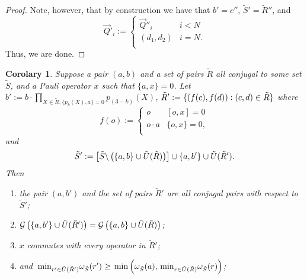\documentclass[twocolumn,showpacs,preprintnumbers,amsmath,amssymb,nofootinbib,pra,floatfix]{revtex4-1}
\newtheorem{corolary}{Corolary}
\newcommand{\lst}{\vec}
\newcommand{\set}{\tilde}
\newcommand{\genfun}{\mathcal{G}}
\begin{document}
\begin{proof}
Note, however, that by construction we have that $b'=c''$, $\set S'=\set R''$, and
$$\lst Q'_i :=
\begin{cases}
\lst Q''_i & i < N \\
(d_1,d_2) & i = N.\\
\end{cases}
$$
Thus, we are done.
\end{proof}
\begin{corolary}
\label{recombination-to-make-commute}
Suppose a pair $(a,b)$ and a set of pairs $\set R$ all conjugal to some set $\set S$, and a Pauli operator $x$ such that $\{a,x\}=0$.  Let $b' := b\cdot \prod_{X\in\set R, \{p_k(X),a\}=0} p_{(3-k)}(X)$, $\set R':=\{\paren{f(c),f(d)}: (c,d)\in\set R\}$ where
$$
f(o) :=
\begin{cases}
o & [o,x]=0 \\
o\cdot a & \{o,x\}=0, \\
\end{cases}
$$
and
$$\set S' := \left[\set S\backslash\paren{\{a,b\} \cup \set U(\set R)}\right]\cup \{a,b'\} \cup \set U(\set R').$$
Then
\begin{enumerate}
\item the pair $(a,b')$ and the set of pairs $\set R'$ are all conjugal pairs with respect to $\set S'$;
\item $\genfun\paren{\{a,b'\}\cup \set U(\set R')}=\genfun\paren{\{a,b\}\cup \set U(\set R)}$;
\item $x$ commutes with every operator in $\set R'$;
\item and $\min_{r'\in \set U(\set R')}\om_{\set S}(r')\ge \min\paren{\om_{\set S}(a),\min_{r\in \set U(\set R)}\om_{\set S}(r)}$;
\end{enumerate}
\end{corolary}
\end{document}
